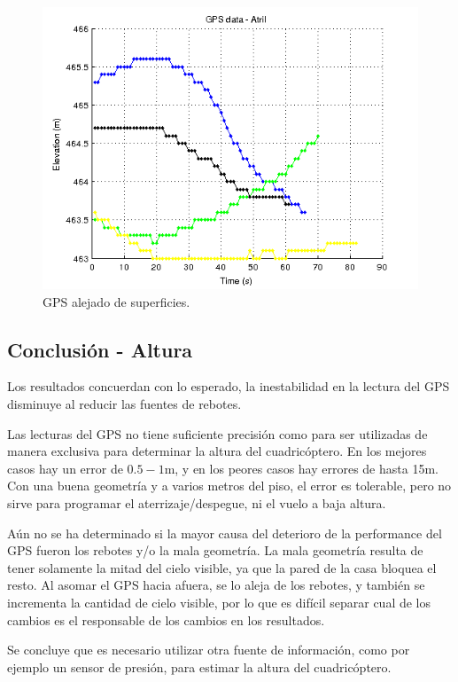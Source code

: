 \documentclass[spanish,12pt,a4paper,titlepage]{report}
\begin{document}
\newpage
\begin{figure}[h!]
\begin{center}
  \includegraphics[width=.75\textwidth]{./img/gps_atril.png}
  \caption{GPS alejado de superficies.}
  \label{fig:gps_atril.png}
\end{center}
\end{figure}

\subsection{Conclusión - Altura}
\label{sec:error-en-altura-conclusion}

Los resultados concuerdan con lo esperado, la inestabilidad en la lectura del GPS disminuye al reducir las fuentes de rebotes.

Las lecturas del GPS no tiene suficiente precisión como para ser utilizadas de manera exclusiva para determinar la altura del cuadricóptero. En los mejores casos hay un error de $0.5-1$m, y en los peores casos hay errores de hasta 15m. Con una buena geometría y a varios metros del piso, el error es tolerable, pero no sirve para programar el aterrizaje/despegue, ni el vuelo a baja altura.

Aún no se ha determinado si la mayor causa del deterioro de la performance del GPS fueron los rebotes y/o la mala geometría. La mala geometría resulta de tener solamente la mitad del cielo visible, ya que la pared de la casa bloquea el resto. Al asomar el GPS hacia afuera, se lo aleja de los rebotes, y también se incrementa la cantidad de cielo visible, por lo que es difícil separar cual de los cambios es el responsable de los cambios en los resultados.

Se concluye que es necesario utilizar otra fuente de información, como por ejemplo un sensor de presión, para estimar la altura del cuadricóptero.
\end{document}
